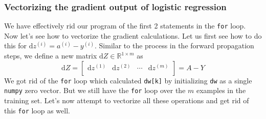 \documentclass{article}[a4paper,12pt]
\theoremstyle{definition}
\begin{document}
\subsubsection{Vectorizing the gradient output of logistic regression}
We have effectively rid our program of the first 2 statements in the \texttt{for} loop. Now let's see how to vectorize the gradient calculations. Let us first see how to do this for $\text{d}z^{(i)}=a^{(i)}-y^{(i)}$. Similar to the process in the  forward propagation steps, we define a new matrix $\text{d}Z\in\mathbb{R}^{1\times m}$ as
$$\text{d}Z=\begin{bmatrix}
	\text{d}z^{(1)} & \text{d}z^{(2)} & \cdots & \text{d}z^{(m)}\\
\end{bmatrix}=A-Y$$
We got rid of the \texttt{for} loop which calculated \texttt{dw[k]} by initializing \texttt{dw} as a single \texttt{numpy} zero vector. But we still have the \texttt{for} loop over the $m$ examples in the training set. Let's now attempt to vectorize all these operations and get rid of this \texttt{for} loop as well.
\vspace{6pt}
\end{document}
